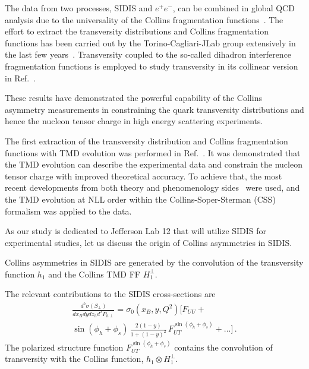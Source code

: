 \documentclass[twocolumn,showpacs,preprintnumbers,amsmath,amssymb,floatfix,prd]{revtex4}
\begin{document}
The data from two processes, SIDIS and $e^+e^-$, can be combined in global QCD analysis due   to the universality of the Collins fragmentation 
functions~\cite{Metz:2002iz}.
The effort to extract the transversity distributions and Collins fragmentation functions 
has been carried out by the Torino-Cagliari-JLab group extensively in the last 
few years~\cite{Anselmino:2007fs,Anselmino:2008jk,Anselmino:2013vqa,Anselmino:2015sxa}.  
Transversity coupled to the so-called dihadron interference fragmentation 
functions is employed to study transversity in its collinear version in Ref.~\cite{Radici:2015mwa}.

These results have demonstrated the powerful capability of the Collins
asymmetry measurements in constraining the quark transversity distributions 
and hence the nucleon tensor charge in high energy scattering experiments. 

The first extraction of the transversity distribution and Collins fragmentation functions with TMD 
evolution was performed in Ref.~\cite{Kang:2015msa}.
It was demonstrated  that the TMD evolution can
describe the experimental data and constrain the nucleon tensor charge with
improved theoretical accuracy.
To achieve that, the most recent developments from both theory and phenomenology 
sides~\cite{Collins:2011zzd,Yuan:2009dw,Kang:2010xv,Kang:2011mr,Echevarria:2012js,Bacchetta:2013pqa,Sun:2013hua,Echevarria:2014xaa,Echevarria:2014rua,Su:2014wpa} 
were used, and the TMD evolution at NLL order within
the Collins-Soper-Sterman (CSS)~\cite{Collins:1981uk,Collins:1984kg} formalism was applied to the data.

As our study is dedicated to Jefferson Lab 12 that will utilize SIDIS for experimental studies, let us discuss the origin of Collins asymmetries in SIDIS.

Collins asymmetries in SIDIS are generated by the convolution of the transversity function  $h_1$ and 
the Collins TMD FF $H_1^\perp$.

The relevant contributions to the SIDIS cross-sections are
\begin{align}
\frac{d^5\sigma(S_\perp)}{dx_B dy dz_h d^2P_{h\perp}}
= \sigma_0(x_B, y, Q^2)
\Big[F_{UU} +   \nonumber \\ 
  \sin(\phi_h+\phi_s)\,
\frac{2 (1-y)}{1+(1-y)^2} \, F_{UT}^{\sin\left(\phi_h +\phi_s\right)} + ... \Big]\,.
  \label{eq:aut-collins}
\end{align}
%
The polarized structure function $F_{UT}^{\sin\left(\phi_h +\phi_s\right)}$ contains the convolution of transversity 
with the Collins function, $h_1 \otimes H_1^\perp$.
\end{document}

